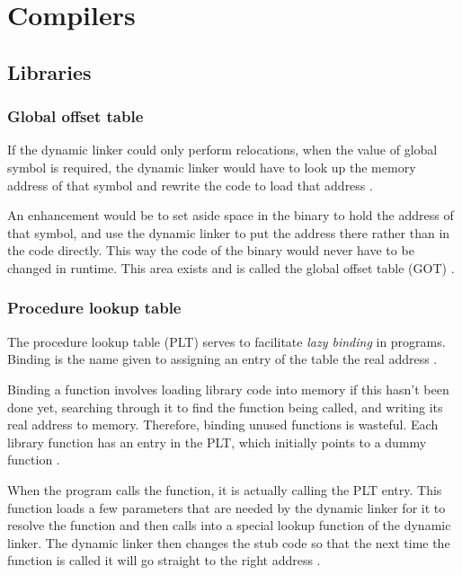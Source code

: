 \chapter{Compilers}

\section{Libraries}

\subsection{Global offset table}

If the dynamic linker could only perform relocations, when the value of global symbol is required, the dynamic linker would have to look up the memory address of that symbol and rewrite the code to load that address \cite{computer-science-from-the-bottom-up}.

An enhancement would be to set aside space in the binary to hold the address of that symbol, and use the dynamic linker to put the address there rather than in the code directly.
This way the code of the binary would never have to be changed in runtime.
This area exists and is called the global offset table (GOT) \cite{computer-science-from-the-bottom-up}.

\subsection{Procedure lookup table}

The procedure lookup table (PLT) serves to facilitate \textit{lazy binding} in programs.
Binding is the name given to assigning an entry of the table the real address \cite{computer-science-from-the-bottom-up}.

Binding a function involves loading library code into memory if this hasn't been done yet, searching through it to find the function being called, and writing its real address to memory.
Therefore, binding unused functions is wasteful.
Each library function has an entry in the PLT, which initially points to a dummy function \cite{computer-science-from-the-bottom-up}.

When the program calls the function, it is actually calling the PLT entry.
This function loads a few parameters that are needed by the dynamic linker for it to resolve the function and then calls into a special lookup function of the dynamic linker.
The dynamic linker then changes the stub code so that the next time the function is called it will go straight to the right address \cite{computer-science-from-the-bottom-up}.

